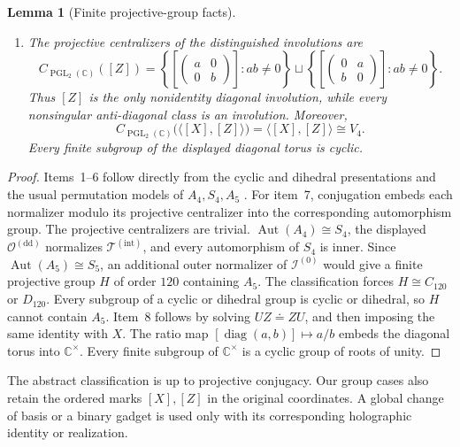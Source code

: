 \documentclass[11pt,letterpaper,onecolumn]{article}
\theoremstyle{plain}
\newtheorem{lemma}[lemma]{Lemma}
\theoremstyle{definition}
\theoremstyle{remark}
\newcommand{\TetInt}{{\mathcal T^{(\mathrm{int})}}}
\newcommand{\OctDD}{{\mathcal O^{(\mathrm{dd})}}}
\newcommand{\IcoZero}{{\mathcal I^{(0)}}}
\newcommand{\PGL}{\operatorname{PGL}}
\newcommand{\diag}{\operatorname{diag}}
\begin{document}
\begin{lemma}[Finite projective-group facts]
\begin{enumerate}
\[        N_{\PGL_2(\mathbb C)}(\OctDD)=\OctDD,
        \qquad
        N_{\PGL_2(\mathbb C)}(\IcoZero)=\IcoZero.
      \]
\item The projective centralizers of the distinguished involutions are
      \[
      C_{\PGL_2(\mathbb C)}([Z])
      =
      \left\{
      \left[\begin{pmatrix}a&0\\0&b\end{pmatrix}\right]:ab\ne0
      \right\}
      \sqcup
      \left\{
      \left[\begin{pmatrix}0&a\\b&0\end{pmatrix}\right]:ab\ne0
      \right\}.
      \]
      Thus \([Z]\) is the only nonidentity diagonal involution, while
      every nonsingular anti-diagonal class is an involution.  Moreover,
      \[
        C_{\PGL_2(\mathbb C)}\bigl(\langle[X],[Z]\rangle\bigr)
        =\langle[X],[Z]\rangle\cong V_4.
      \]
      Every finite subgroup of the displayed diagonal torus is cyclic.
\end{enumerate}
\end{lemma}

\begin{proof}
Items~1--6 follow directly from the cyclic and dihedral presentations and
the usual permutation models of \(A_4,S_4,A_5\)
\cite{DixonMortimer1996}.  For item~7, conjugation
embeds each normalizer modulo its projective centralizer into the
corresponding automorphism group.  The projective centralizers are trivial.
\(\operatorname{Aut}(A_4)\cong S_4\), the displayed \(\OctDD\)
normalizes \(\TetInt\), and every automorphism of \(S_4\) is inner.
Since \(\operatorname{Aut}(A_5)\cong S_5\), an additional outer normalizer
of \(\IcoZero\) would give a finite projective group \(H\) of order \(120\)
containing \(A_5\).  The classification forces \(H\cong C_{120}\) or
\(D_{120}\). Every subgroup of a cyclic or dihedral group is cyclic or
dihedral, so \(H\) cannot contain \(A_5\).  Item~8 follows by solving
\(UZ\doteq ZU\), and then imposing the same identity with \(X\).  The ratio
map \([\diag(a,b)]\mapsto a/b\) embeds the diagonal torus into
\(\mathbb C^\times\). Every finite subgroup of \(\mathbb C^\times\) is a cyclic group
of roots of unity.
\end{proof}

The abstract classification is up to projective conjugacy. Our group
cases also retain the ordered marks \([X],[Z]\) in the original
coordinates. A global change of basis or a binary gadget is used only
with its corresponding holographic identity or realization.
\end{document}
